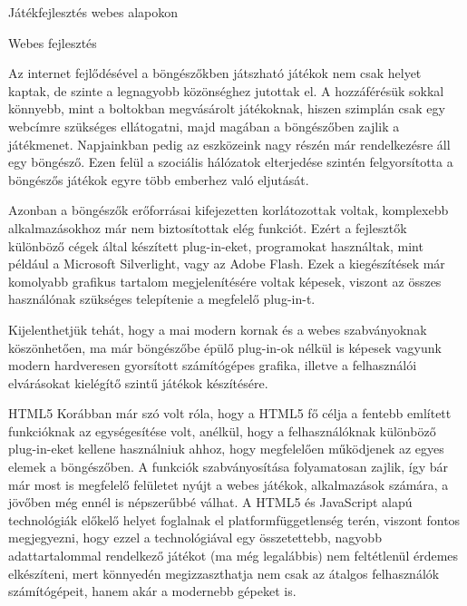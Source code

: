 \begin{MyChapter}{Játékfejlesztés webes alapokon}	

	\begin{MySection}{Webes fejlesztés}
		
		Az internet fejlődésével a böngészőkben játszható játékok nem csak helyet kaptak, de szinte a legnagyobb közönséghez jutottak el. A hozzáférésük sokkal könnyebb, mint a boltokban megvásárolt játékoknak, hiszen szimplán csak egy webcímre szükséges ellátogatni, majd magában a böngészőben zajlik a játékmenet. Napjainkban pedig az eszközeink nagy részén már rendelkezésre áll egy böngésző. Ezen felül a szociális hálózatok elterjedése szintén felgyorsította a böngészős játékok egyre több emberhez való eljutását.
		
		
		Azonban a böngészők erőforrásai kifejezetten korlátozottak voltak, komplexebb alkalmazásokhoz már nem biztosítottak elég funkciót. Ezért a fejlesztők különböző cégek által készített plug-in-eket, programokat használtak, mint például a Microsoft Silverlight, vagy az Adobe Flash. Ezek a kiegészítések már komolyabb grafikus tartalom megjelenítésére voltak képesek, viszont az összes használónak szükséges telepítenie a megfelelő plug-in-t. 
		
		Kijelenthetjük tehát, hogy a mai modern kornak és a webes szabványoknak köszönhetően, ma már böngészőbe épülő plug-in-ok nélkül is képesek vagyunk modern hardveresen gyorsított számítógépes grafika, illetve a felhasználói elvárásokat kielégítő szintű játékok készítésére.
	\end{MySection}

	\begin{MySection}{HTML5}
		Korábban már szó volt róla, hogy a HTML5 fő célja a fentebb említett funkcióknak az egységesítése volt, anélkül, hogy a felhasználóknak különböző plug-in-eket kellene használniuk ahhoz, hogy megfelelően működjenek az egyes elemek a böngészőben.
		A funkciók szabványosítása folyamatosan zajlik, így bár már most is megfelelő felületet nyújt a webes játékok, alkalmazások számára, a jövőben még ennél is népszerűbbé válhat.
		A HTML5 és JavaScript alapú technológiák előkelő helyet foglalnak el platformfüggetlenség terén, viszont fontos megjegyezni, hogy ezzel a technológiával egy összetettebb, nagyobb adattartalommal rendelkező játékot (ma még legalábbis) nem feltétlenül érdemes elkészíteni, mert könnyedén megizzaszthatja nem csak az átalgos felhasználók számítógépeit, hanem akár a modernebb gépeket is.
	\end{MySection}


\end{MyChapter}
